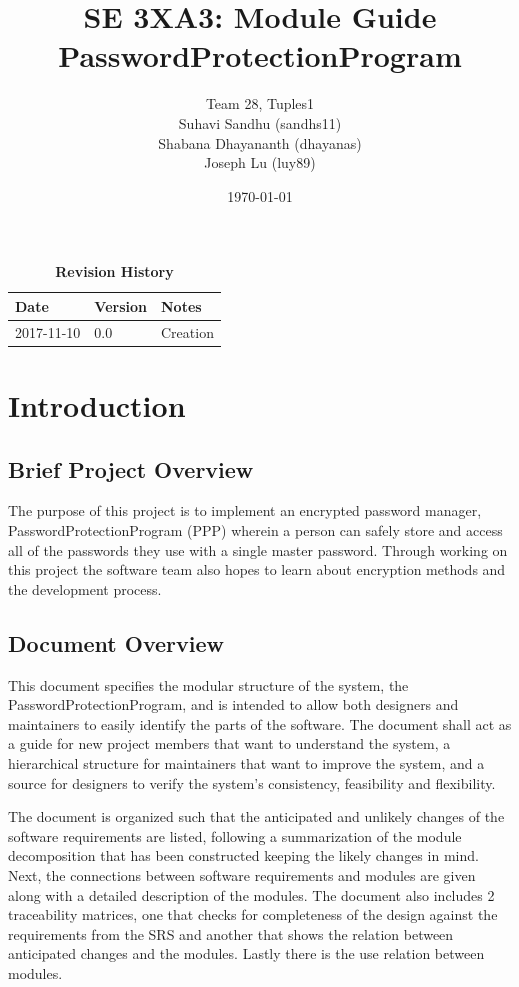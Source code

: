 \documentclass[12pt, titlepage]{article}
\title{SE 3XA3: Module Guide\\PasswordProtectionProgram}
\author{Team 28, Tuples1
		\\ Suhavi Sandhu (sandhs11)
		\\ Shabana Dhayananth (dhayanas)
		\\ Joseph Lu (luy89)
}
\date{\today}
\begin{document}
\maketitle

\tableofcontents
\listoftables
\listoffigures

\begin{table}[bp]
\caption{\bf Revision History}
\begin{tabularx}{\textwidth}{p{3cm}p{2cm}X}
\toprule {\bf Date} & {\bf Version} & {\bf Notes}\\
\midrule
2017-11-10 & 0.0 & Creation\\
\bottomrule
\end{tabularx}
\end{table}

\newpage


\section{Introduction}\label{Intro}

\subsection{Brief Project Overview} \label{ProjOver}
The purpose of this project is to implement an encrypted password manager, PasswordProtectionProgram (PPP) wherein a person can 
safely store and access all of the passwords they use with a single master password. Through working on this project the software 
team also hopes to learn about encryption methods and the development process.

\subsection{Document Overview} \label{DocOver}
This document specifies the modular structure of the system, the 
PasswordProtectionProgram, and is intended to allow both designers and 
maintainers to easily identify the parts of the software. The document 
shall act as a guide for new project members that want to understand 
the system, a hierarchical structure for maintainers that want to 
improve the system, and a source for designers to verify the system’s 
consistency, feasibility and flexibility.

The document is organized such that the anticipated and unlikely 
changes of the software requirements are listed, following a 
summarization of the module decomposition that has been constructed 
keeping the likely changes in mind. Next, the connections between 
software requirements and modules are given along with a detailed 
description of the modules. The document also includes 2 traceability 
matrices, one that checks for completeness of the design against the 
requirements from the SRS and another that shows the relation between 
anticipated changes and the modules. Lastly there is the use relation 
between modules.
\end{document}
